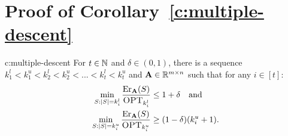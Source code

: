 \documentclass{article}
\begin{document}
\section{Proof of Corollary~\ref{c:multiple-descent}}
\label{s:proofmultidescent}
\begin{repcorollary}{c:multiple-descent}
  For $t\in\mathbb N$ and $\delta\in(0,1)$, there is a
  sequence $k_1^l<k_1^u<k_2^l<k_2^u<...<k_t^l<k_t^u$ and
  $\mathbf A\in\mathbb R^{m\times n}$ such that for any $i\in[t]$:
  \begin{align*}
    \min_{S:|S|=k_i^l}\frac{\mathrm{Er}_\mathbf A(S)}{\textsc{OPT}_{k_i^l}}&\leq 1+\delta
                                 \quad\text{and }\\
    \min_{S:|S|=k_i^u}\frac{\mathrm{Er}_\mathbf A(S)}{\textsc{OPT}_{k_i^u}} &\geq
    (1-\delta)(k_i^u+1).
  \end{align*}
\end{repcorollary}
\end{document}
